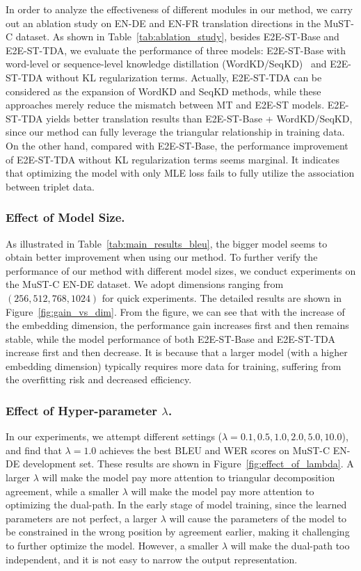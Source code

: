 \documentclass[letterpaper]{article} %
\begin{document}
In order to analyze the effectiveness of different modules in our method, we carry out an ablation study on EN-DE and EN-FR translation directions in the MuST-C dataset.
As shown in Table~\ref{tab:ablation_study}, besides E2E-ST-Base and E2E-ST-TDA, we evaluate the performance of three models: E2E-ST-Base with word-level or sequence-level knowledge distillation (WordKD/SeqKD)~\cite{Kim2016SequenceLevelKD} and E2E-ST-TDA without KL regularization terms.
Actually, E2E-ST-TDA can be considered as the expansion of WordKD and SeqKD methods, while these approaches merely reduce the mismatch between MT and E2E-ST models.
E2E-ST-TDA yields better translation results than E2E-ST-Base + WordKD/SeqKD, since our method can fully leverage the triangular relationship in training data.
On the other hand, compared with E2E-ST-Base, the performance improvement of E2E-ST-TDA without KL regularization terms seems marginal.
It indicates that optimizing the model with only MLE loss fails to fully utilize the association between triplet data. 

\subsubsection{Effect of Model Size.}

As illustrated in Table~\ref{tab:main_results_bleu}, the bigger model seems to obtain better improvement when using our method.
To further verify the performance of our method with different model sizes, we conduct experiments on the MuST-C EN-DE dataset.
We adopt dimensions ranging from $(256, 512, 768, 1024)$ for quick experiments.
The detailed results are shown in Figure~\ref{fig:gain_vs_dim}.
From the figure, we can see that with the increase of the embedding dimension, the performance gain increases first and then remains stable,
while the model performance of both E2E-ST-Base and E2E-ST-TDA increase first and then decrease. 
It is because that a larger model (with a higher embedding dimension) typically requires more data for training, suffering from the overfitting risk and decreased efficiency.


\subsubsection{Effect of Hyper-parameter $\lambda$.}
In our experiments, we attempt different settings ($\lambda = 0.1, 0.5, 1.0, 2.0, 5.0, 10.0$), and find that $\lambda = 1.0$ achieves the best BLEU and WER scores on MuST-C EN-DE development set. 
These results are shown in Figure~\ref{fig:effect_of_lambda}. 
A larger $\lambda$ will make the model pay more attention to triangular decomposition agreement, while a smaller $\lambda$ will make the model pay more attention to optimizing the dual-path. 
In the early stage of model training, since the learned parameters are not perfect, a larger $\lambda$ will cause the parameters of the model to be constrained in the wrong position by agreement earlier, making it challenging to further optimize the model. 
However, a smaller $\lambda$ will make the dual-path too independent, and it is not easy to narrow the output representation.
\end{document}
